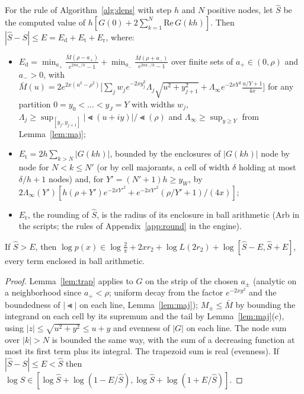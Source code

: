 \begin{theorem}\label{thm:dens}
For the rule of Algorithm~\ref{alg:dens} with step $h$ and $N$ positive nodes, let
$\hat S$ be the computed value of $h[G(0)+2\sum_{k=1}^N\mathrm{Re}\,G(kh)]$. Then $|\hat S-S|\le E=E_{\mathrm d}+
E_{\mathrm t}+E_{\mathrm r}$, where:
\begin{itemize}
\item $E_{\mathrm d}=\min_{a_+}\frac{\bar M(\rho-a_+)}{e^{2\pi a_+/h}-1}+\min_{a_-}\frac{\bar M(\rho+a_-)}
{e^{2\pi a_-/h}-1}$ over finite sets of $a_+\in(0,\rho)$ and $a_->0$, with
$\bar M(u)=2e^{2x(u^2-\rho^2)}\bigl[\sum_jw_je^{-2xy_j^2}\Lambda_j\sqrt{u^2+y_{j+1}^2}+\Lambda_\infty
e^{-2xY^2}\frac{u/Y+1}{4x}\bigr]$ for any partition $0=y_0<\dots<y_J=Y$ with widths $w_j$, $\Lambda_j\ge
\sup_{[y_j,y_{j+1}]}|\Lt(u+iy)|/\Lt(\rho)$ and $\Lambda_\infty\ge\sup_{y\ge Y}$ from Lemma~\ref{lem:maj};
\item $E_{\mathrm t}=2h\sum_{k>N}|G(kh)|$, bounded by the enclosures of $|G(kh)|$ node by node for $N<k\le N'$
(or by cell majorants, a cell of width $\delta$ holding at most $\delta/h+1$ nodes) and, for $Y'=(N'+1)h\ge y_W$,
by $2\Lambda_\infty(Y')[h(\rho+Y')e^{-2xY'^2}+e^{-2xY'^2}(\rho/Y'+1)/(4x)]$;
\item $E_{\mathrm r}$, the rounding of $\hat S$, is the radius of its enclosure in ball arithmetic (Arb in the
scripts; the rules of Appendix~\ref{app:round} in the engine).
\end{itemize}
If $\hat S>E$, then $\log p(x)\in\log\frac2\pi+2xr_2+\log L(2r_2)+\log[\hat S-E,\hat S+E]$, every term enclosed
in ball arithmetic.
\end{theorem}
\begin{proof}
Lemma~\ref{lem:trap} applies to $G$ on the strip of the chosen $a_\pm$ (analytic on a neighborhood since
$a_+<\rho$; uniform decay from the factor $e^{-2xy^2}$ and the boundedness of $|\Lt|$ on each line,
Lemma~\ref{lem:maj}); $M_\pm\le\bar M$ by bounding the integrand on each cell by its supremum and the tail by
Lemma~\ref{lem:maj}(c), using $|z|\le\sqrt{u^2+y^2}\le u+y$ and evenness of $|G|$ on each line. The node sum
over $|k|>N$ is bounded the same way, with the sum of a decreasing function at most its first term plus its
integral. The trapezoid sum is real (evenness). If $|\hat S-S|\le E<\hat S$ then $\log S\in[\log\hat
S+\log(1-E/\hat S),\log\hat S+\log(1+E/\hat S)]$.
\end{proof}


